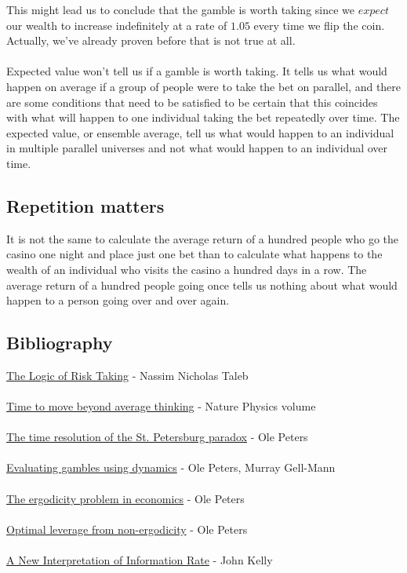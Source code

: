 \documentclass[12pt]{article}
\begin{document}
This might lead us to conclude that the gamble is worth taking since we $expect$ our wealth to increase indefinitely at a rate of $1.05$ every time we flip the coin. Actually, we've already proven before that is not true at all.
\\\\
Expected value won't tell us if a gamble is worth taking. It tells us what would happen on average if a group of people were to take the bet on parallel, and there are some conditions that need to be satisfied to be certain that this coincides with what will happen to one individual taking the bet repeatedly over time. The expected value, or ensemble average, tell us what would happen to an individual in multiple parallel universes and not what would happen to an individual over time.

\subsection{Repetition matters}
It is not the same to calculate the average return of a hundred people who go the casino one night and place just one bet than to calculate what happens to the wealth of an individual who visits the casino a hundred days in a row. The average return of a hundred people going once tells us nothing about what would happen to a person going over and over again.

\subsection{Bibliography}
\href{https://medium.com/incerto/the-logic-of-risk-taking-107bf41029d3}{The Logic of Risk Taking} - Nassim Nicholas Taleb
\\\\
\href{https://www.nature.com/articles/s41567-019-0758-3}{Time to move beyond average thinking} - Nature Physics volume
\\\\
\href{https://arxiv.org/abs/1011.4404}{The time resolution of the St. Petersburg paradox} - Ole Peters
\\\\
\href{https://arxiv.org/abs/1405.0585}{Evaluating gambles using dynamics} - Ole Peters, Murray Gell-Mann
\\\\
\href{https://www.nature.com/articles/s41567-019-0732-0}{The ergodicity problem in economics} - Ole Peters
\\\\
\href{https://arxiv.org/abs/0902.2965}{Optimal leverage from non-ergodicity} - Ole Peters
\\\\
\href{https://www.princeton.edu/~wbialek/rome/refs/kelly_56.pdf}{A New Interpretation of Information Rate} - John Kelly
\end{document}
